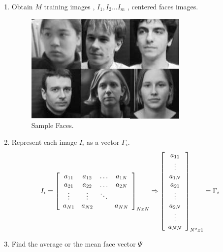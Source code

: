 \documentclass[a4paper,twoside]{article}
\begin{document}
\begin{enumerate}
\item Obtain $M$ training images , $I_1, I_2 \dots I_m$  , centered faces images.

\begin{figure}[h]
 \begin{center}
 \centering
\includegraphics[scale=0.3]{training-images.jpg} \caption{Sample Faces. }
 \end{center}\end{figure}
\item Represent each image $I_i$ as a vector $\Gamma_i$.
\begin{equation}
\label{arrequation}
I_i  = \left[ {\begin{array}{*{20}c} {a_{11} } & {a_{12} } &\ldots& {a_{1N} }  \\
   {a_{21} } & {a_{22} } &  \ldots   & {a_{2N} }  \\
    \vdots  &  \vdots  &  \ddots   & {}  \\
   {a_{N1} } & {a_{N2} }  & {} & {a_{NN} }  \\
\end{array}} \right]_{NxN} \Rightarrow\left[
{\begin{array}{*{20}c}
   {a_{11} }  \\
   {\vdots}  \\
    {a_{1N} }  \\
     {a_{21}}  \\
        {\vdots}  \\
   {a_{2N} }  \\
   {\vdots}  \\
   {a_{NN} }  \\
\end{array}} \right]_{N^2 x1} = \Gamma _i
\end{equation}
\item Find the average or the mean face vector  $\Psi$


\end{enumerate}
\end{document}
